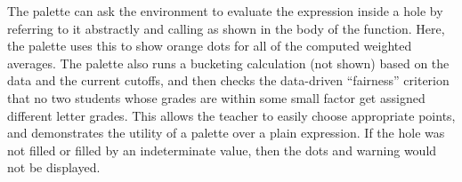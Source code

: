 The palette can ask the environment to evaluate the expression
 inside a hole by referring to it abstractly and calling  as shown in the body 
 of the  function. Here, the palette uses this to show orange dots for all of 
 the computed weighted averages. The palette also runs a bucketing calculation (not shown)
based on the data and the current cutoffs, and then checks
the data-driven ``fairness'' criterion that no two students
whose grades are within some small factor get assigned
different letter grades. This allows the teacher to easily choose appropriate points, and demonstrates the utility of a palette over a plain expression. 
 If the hole was not filled or filled by an indeterminate value, then 
 the dots and warning would not be displayed.
